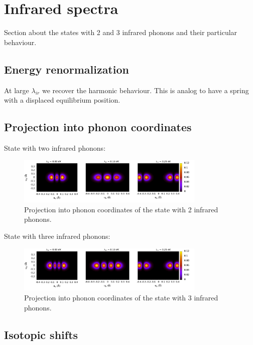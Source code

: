 \chapter{Infrared spectra}
\label{chap:more_ir}

Section about the states with 2 and 3 infrared phonons and their particular behaviour.

\section{Energy renormalization}

At large $\lambda_{ir}$ we recover the harmonic behaviour. This is analog to have a spring with a displaced equilibrium position.

\section{Projection into phonon coordinates}

State with two infrared phonons:

\begin{figure}[ht!]
\centering
\includegraphics[width=0.8\textwidth]{images/ph-second_infrared.png}
\caption{Projection into phonon coordinates of the state with 2 infrared phonons.}
\label{fig:ph-second_infrared}
\end{figure}

State with three infrared phonons:

\begin{figure}[ht!]
\centering
\includegraphics[width=0.8\textwidth]{images/ph-third_infrared.png}
\caption{Projection into phonon coordinates of the state with 3 infrared phonons.}
\label{fig:ph-third_infrared}
\end{figure}

\section{Isotopic shifts}

